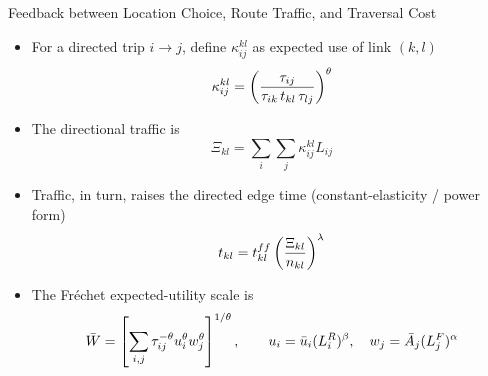 \documentclass[11pt,aspectratio=169]{beamer}
\begin{document}
\begin{frame}{Feedback between Location Choice, Route Traffic, and Traversal Cost}
\begin{itemize}
  \item For a directed trip $i\to j$, define $\kappa^{kl}_{ij}$ as expected use of link $(k,l)$
  \vspace{-1em}\begin{equation}
    \kappa^{kl}_{ij} = \left( \frac{\tau_{ij}} {\tau_{ik}\,t_{kl}\,\tau_{lj}} \right)^\theta
  \vspace{-0.5em}\end{equation}
  \item The directional traffic is
  \begin{equation}\label{eq:Xi_c}
  \Xi_{kl} = \sum_i\sum_j \kappa^{kl}_{ij}L_{ij}
  \end{equation}
  \item Traffic, in turn, raises the directed edge time (constant-elasticity / power form)
  \vspace{-0.5em}\begin{equation}\label{eq:c_Xi}
    t_{kl} = t_{kl}^{ff} \left(\frac{\Xi_{kl}}{n_{kl}}\right)^{\lambda}
  \vspace{-0.5em}\end{equation}
  \item The Fr\'echet expected-utility scale is
  \vspace{-0.5em}\begin{equation}
    \bar W
    =
    \left[
    \sum_{i,j}\tau_{ij}^{-\theta}u_i^\theta w_j^\theta
    \right]^{1/\theta},
    \qquad
    u_i=\bar u_i(L_i^R)^\beta,\quad
    w_j=\bar A_j(L_j^F)^\alpha
  \vspace{-0.8em}\end{equation}
\end{itemize}
\end{frame}
\end{document}
